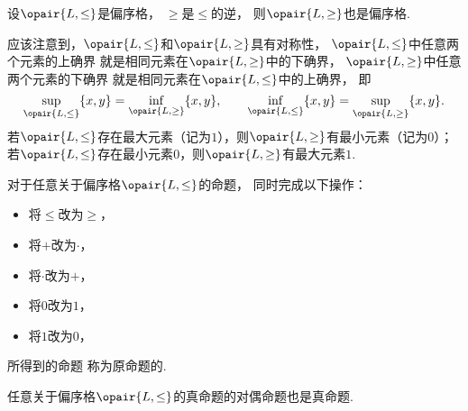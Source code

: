 \begin{proposition}
设\(\opair{L,\leq}\)是偏序格，
\(\geq\)是\(\leq\)的逆，
则\(\opair{L,\geq}\)也是偏序格.
\end{proposition}

应该注意到，\(\opair{L,\leq}\)和\(\opair{L,\geq}\)具有对称性，
\(\opair{L,\leq}\)中任意两个元素的上确界
就是相同元素在\(\opair{L,\geq}\)中的下确界，
\(\opair{L,\geq}\)中任意两个元素的下确界
就是相同元素在\(\opair{L,\leq}\)中的上确界，
即\[
	\sup_{\opair{L,\leq}}\{x,y\}
	= \inf_{\opair{L,\geq}}\{x,y\},
	\qquad
	\inf_{\opair{L,\leq}}\{x,y\}
	= \sup_{\opair{L,\geq}}\{x,y\}.
\]
若\(\opair{L,\leq}\)存在最大元素（记为\(1\)），则\(\opair{L,\geq}\)有最小元素（记为\(0\)）；
若\(\opair{L,\leq}\)存在最小元素\(0\)，则\(\opair{L,\geq}\)有最大元素\(1\).

\begin{definition}
对于任意关于偏序格\(\opair{L,\leq}\)的命题，
同时完成以下操作：\begin{itemize}
	\item 将\(\leq\)改为\(\geq\)，
	\item 将\(+\)改为\(\cdot\)，
	\item 将\(\cdot\)改为\(+\)，
	\item 将\(0\)改为\(1\)，
	\item 将\(1\)改为\(0\)，
\end{itemize}
所得到的命题
称为原命题的.
\end{definition}

\begin{theorem}
任意关于偏序格\(\opair{L,\leq}\)的真命题的对偶命题也是真命题.
\end{theorem}
